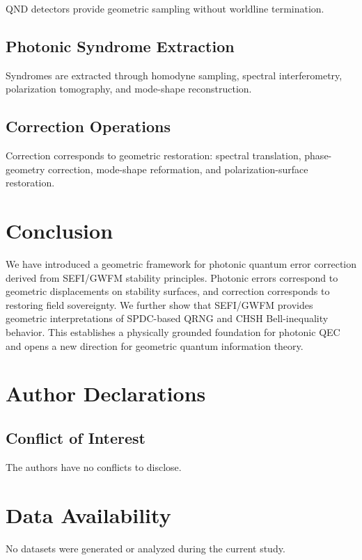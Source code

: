 \documentclass[aip, adv, reprint, superscriptaddress]{revtex4-2}
\begin{document}
QND detectors provide geometric sampling without worldline termination.

\subsection{Photonic Syndrome Extraction}

Syndromes are extracted through homodyne sampling, spectral interferometry, 
polarization tomography, and mode-shape reconstruction.

\subsection{Correction Operations}

Correction corresponds to geometric restoration: spectral translation, phase-geometry 
correction, mode-shape reformation, and polarization-surface restoration.

\section{Conclusion}

We have introduced a geometric framework for photonic quantum error correction derived 
from SEFI/GWFM stability principles. Photonic errors correspond to geometric 
displacements on stability surfaces, and correction corresponds to restoring field 
sovereignty. We further show that SEFI/GWFM provides geometric interpretations of 
SPDC-based QRNG and CHSH Bell-inequality behavior. This establishes a physically 
grounded foundation for photonic QEC and opens a new direction for geometric quantum 
information theory.

\section*{Author Declarations}

\subsection*{Conflict of Interest}
The authors have no conflicts to disclose.

\section*{Data Availability}
No datasets were generated or analyzed during the current study.


\end{document}
